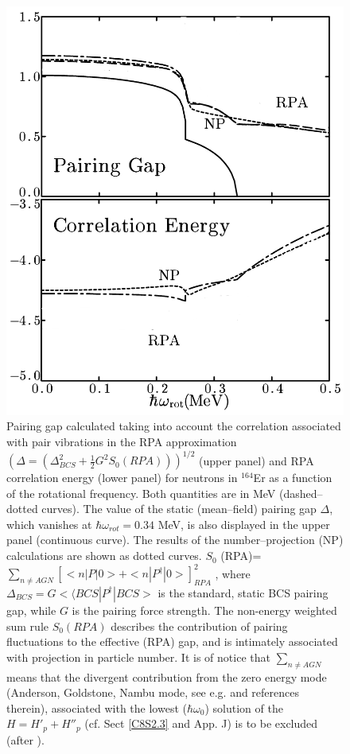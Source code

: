   \begin{figure}
  \centerline{\includegraphics*[width=\textwidth,angle=0]{nutshell/figs/fig1_1_2.pdf}}
  \caption{Pairing gap calculated taking into account the correlation associated with pair vibrations in the RPA approximation $(\Delta=(\Delta^2_{BCS}+\tfrac{1}{2}G^2S_0(RPA)))^{1/2}$ (upper panel) and RPA correlation energy (lower panel) for neutrons in $^{164}$Er as a function of the rotational frequency. Both quantities are in MeV (dashed--dotted curves). The value of the static (mean--field) pairing gap $\Delta$, which vanishes at $\hbar \omega_{rot}=0.34 $ MeV, is also displayed in the upper panel (continuous curve). The results of the number--projection (NP) calculations are shown as dotted curves.  $S_0$ (RPA)= $\sum_{n \neq AGN} \left[<n|P |0>  + <n|P^{\dagger} |0>\right]^2_{RPA}$ ,
    where \mbox{$\Delta_{BCS} = G<⟨BCS|P^{\dagger}|BCS>$} is the standard, static BCS pairing gap,
    while $G$ is the pairing force strength. The non-energy weighted sum rule $S_0 (RPA)$
    describes the contribution of pairing fluctuations to the effective (RPA) gap,
    and is intimately associated with projection in particle number. It is of notice
    that $\sum_{n \neq AGN}$ means that the divergent contribution from the zero energy mode
    (Anderson, Goldstone, Nambu mode, see e.g. \cite{Broglia:00} and references therein), associated with the lowest ($\hbar \omega_0$) solution
    of the $H = H'_{p} +H''_p$ (cf. Sect \ref{C8S2.3} and \cite{Brink:05} App. J) is to be excluded (after \cite{Shimizu:90}).}\label{fig1.2}
  \end{figure}
  
